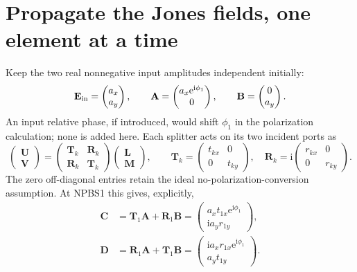 \documentclass[11pt,a4paper]{article}
\newcommand{\ee}{\mathrm e}
\newcommand{\ii}{\mathrm i}
\begin{document}
\section{Propagate the Jones fields, one element at a time}
Keep the two real nonnegative input amplitudes independent initially:
\[
\mathbf E_{\rm in}=\begin{pmatrix}a_x\\a_y\end{pmatrix},\qquad
\mathbf A=\begin{pmatrix}a_x\ee^{\ii\phi_1}\\0\end{pmatrix},\qquad
\mathbf B=\begin{pmatrix}0\\a_y\end{pmatrix}.
\]
An input relative phase, if introduced, would shift $\phi_1$ in the polarization
calculation; none is added here. Each splitter acts on its two incident ports as
\begin{equation}
\begin{pmatrix}\mathbf U\\\mathbf V\end{pmatrix}
=\begin{pmatrix}\mathbf T_k&\mathbf R_k\\\mathbf R_k&\mathbf T_k\end{pmatrix}
\begin{pmatrix}\mathbf L\\\mathbf M\end{pmatrix},\qquad
\mathbf T_k=\begin{pmatrix}t_{kx}&0\\0&t_{ky}\end{pmatrix},\quad
\mathbf R_k=\ii\begin{pmatrix}r_{kx}&0\\0&r_{ky}\end{pmatrix}.
\end{equation}
The zero off-diagonal entries retain the ideal no-polarization-conversion
assumption. At NPBS1 this gives, explicitly,
\begin{align}
\mathbf C&=\mathbf T_1\mathbf A+\mathbf R_1\mathbf B
=\begin{pmatrix}a_xt_{1x}\ee^{\ii\phi_1}\\\ii a_yr_{1y}\end{pmatrix},\\
\mathbf D&=\mathbf R_1\mathbf A+\mathbf T_1\mathbf B
=\begin{pmatrix}\ii a_xr_{1x}\ee^{\ii\phi_1}\\a_yt_{1y}\end{pmatrix}.
\end{align}
\end{document}
